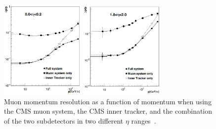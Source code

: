 \begin{figure}
\centering
\includegraphics[width=0.75\textwidth]{figures/lhc_and_cms/muon_momentum_resolution.png}
\caption{Muon momentum resolution as a function of momentum when using the CMS muon system, the CMS inner tracker, and the combination of the two subdetectors in two different $\eta$ ranges~\cite{cms_tdr_v1}.}
\label{muon_momentum_resolution}
\end{figure}